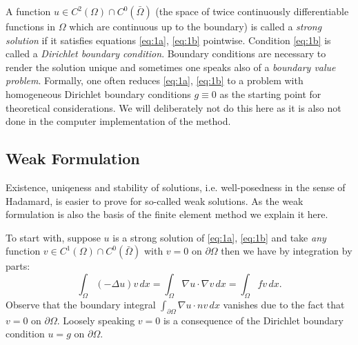 \documentclass[a4paper,12pt]{article}
\begin{document}
A function $u\in C^2(\Omega)\cap C^0(\bar\Omega)$ 
(the space of twice continuously differentiable functions in $\Omega$ which are continuous
up to the boundary)
is called a {\em strong solution}
if it satisfies equations \eqref{eq:1a}, \eqref{eq:1b} pointwise. 
Condition \eqref{eq:1b} is called a {\em Dirichlet boundary condition}. Boundary conditions
are necessary to render the solution unique and sometimes one speaks also
of a {\em boundary value problem}.
Formally, one often reduces \eqref{eq:1a}, \eqref{eq:1b}
to a problem with homogeneous Dirichlet boundary conditions $g\equiv 0$ as the
starting point for theoretical considerations. We will deliberately not do this
here as it is also not done in the computer implementation of the method. 

\subsection{Weak Formulation}

Existence, uniqeness and stability of solutions, i.e. well-posedness in the
sense of Hadamard, is easier to prove for so-called weak solutions. As the weak
formulation is also the basis of the finite element method we explain it here.

To start with, suppose $u$ is a strong solution of \eqref{eq:1a}, \eqref{eq:1b} and take 
{\em any } function
$v\in C^1(\Omega)\cap C^0(\bar\Omega)$ with $v=0$ on $\partial\Omega$ then we
have by integration by parts:
\begin{equation*}
\int_\Omega (-\Delta u) v \,dx = 
\int_\Omega \nabla u \cdot \nabla v \,dx= \int_\Omega fv \,dx.
\end{equation*}
Observe that the boundary integral $\int_{\partial\Omega} \nabla u\cdot n v\,dx$ vanishes
due to the fact that $v=0$ on $\partial\Omega$. Loosely speaking $v=0$ is a consequence
of the Dirichlet boundary condition $u=g$ on $\partial\Omega$.
\end{document}
